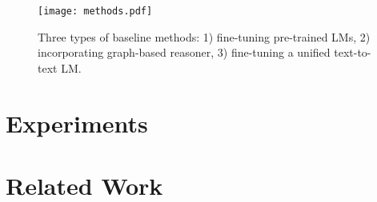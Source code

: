 \documentclass[11pt,a4paper]{article}
\newcommand{\cmark}{\ding{51}}%
\newcommand{\xmark}{\ding{55}}%
\begin{document}

	


 


 

 



\begin{figure}[th!]
	\centering
	\texttt{[image: methods.pdf]}
	\caption{Three types of baseline methods: 1) fine-tuning pre-trained LMs, 2) incorporating graph-based reasoner, 3) fine-tuning a unified text-to-text LM. }
	\label{fig:models} 
\end{figure}

\section{Experiments}\label{sec:exp}
  



\section{Related Work}\label{sec:rel_work}

\end{document}
